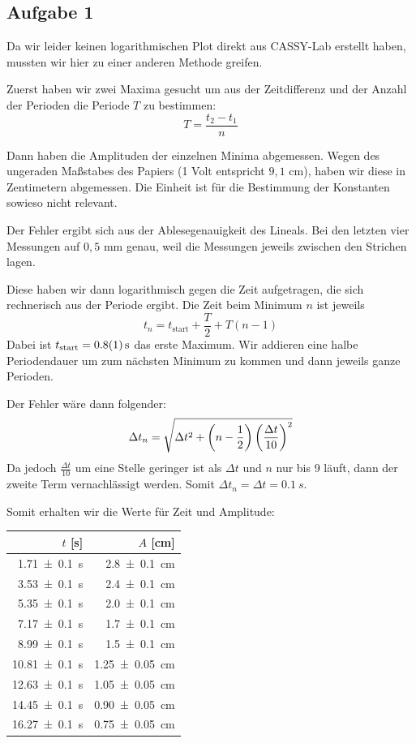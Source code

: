 \documentclass[a4paper,german,12pt,smallheadings]{scrartcl}
\begin{document}
\subsection{Aufgabe 1}
Da wir leider keinen logarithmischen Plot direkt aus CASSY-Lab erstellt haben,
mussten wir hier zu einer anderen Methode greifen.

Zuerst haben wir zwei Maxima gesucht um aus der Zeitdifferenz und der Anzahl
der Perioden die Periode $T$ zu bestimmen:
\begin{equation}
  T = \frac{t_2 - t_1}{n}
\end{equation}

Dann haben die Amplituden der einzelnen Minima abgemessen.
Wegen des ungeraden Maßstabes des Papiers (1 Volt entspricht $9{,}1$
cm), haben wir diese in Zentimetern abgemessen. Die Einheit ist für die
Bestimmung der Konstanten sowieso nicht relevant.

Der Fehler ergibt sich aus der Ablesegenauigkeit des Lineals. Bei den letzten
vier Messungen auf $0{,}5$ mm genau, weil die Messungen jeweils zwischen
den Strichen lagen.

Diese haben wir dann logarithmisch gegen die Zeit aufgetragen, die sich
rechnerisch aus der Periode ergibt. Die Zeit beim Minimum $n$ ist jeweils
\begin{equation}
  t_n = t_\text{start} + \frac{T}{2} + T(n-1)
\end{equation}
Dabei ist $t_\text{start} = \SI{0.8+-0.1}{s}$ das erste Maximum. Wir addieren
eine halbe Periodendauer um zum nächsten Minimum zu kommen und dann jeweils
ganze Perioden.

Der Fehler wäre dann folgender:
\begin{equation}
  \Delta t_n = \sqrt{\Delta t^2 + \del{n- \frac{1}{2}} \del{\frac{\Delta t}{10}}^2}
\end{equation}
Da jedoch $\frac{\Delta t}{10}$ um eine Stelle geringer ist als $\Delta t$ und
$n$ nur bis 9 läuft, dann der zweite Term vernachlässigt werden. Somit
$\Delta t_n = \Delta t = \SI{0.1}{s}$.

Somit erhalten wir die Werte für Zeit und Amplitude:

\begin{tabular}{r|r}
  $t$ [s] & $A$ [cm] \\
  \hline
  \SI{ 1.71+-0.1}{s} & \SI{ 2.8+-0.1 }{cm} \\
  \SI{ 3.53+-0.1}{s} & \SI{ 2.4+-0.1 }{cm} \\
  \SI{ 5.35+-0.1}{s} & \SI{ 2,0+-0.1 }{cm} \\
  \SI{ 7.17+-0.1}{s} & \SI{ 1.7+-0.1 }{cm} \\
  \SI{ 8.99+-0.1}{s} & \SI{ 1.5+-0.1 }{cm} \\
  \SI{10.81+-0.1}{s} & \SI{1.25+-0.05}{cm} \\
  \SI{12.63+-0.1}{s} & \SI{1.05+-0.05}{cm} \\
  \SI{14.45+-0.1}{s} & \SI{0.90+-0.05}{cm} \\
  \SI{16.27+-0.1}{s} & \SI{0.75+-0.05}{cm} \\
\end{tabular}
\end{document}
